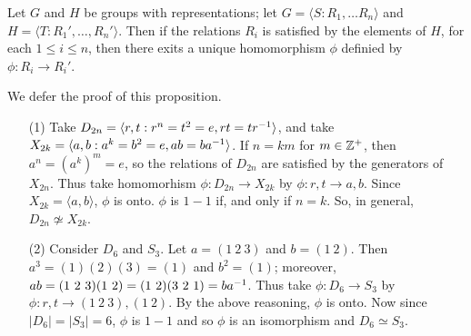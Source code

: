 \begin{proposition}\label{proposition_1.5.4}
  Let $G$ and  $H$ be groups with representations; let  $G=\langle S : R_1,
  \dots R_n \rangle$ and $H=\langle T : R_1', \dots, R_n'\rangle$. Then if the
  relations $R_i$ is satisfied by the elements of $H$, for each  $1 \leq i
  \leq n$, then there exits a unique homomorphism  $\phi$ definied by
  $\phi:R_i \rightarrow R_i'$.
\end{proposition}
\begin{remark}
  We defer the proof of this proposition.
\end{remark}

\begin{example}\label{example_1.14}
  \begin{enumerate}
    \item[(1)] Take $D_{2n}=\langle r,t : r^n=t^2=e, rt=tr^{-1} \rangle$, and
      take $X_{2k}=\langle a,b : a^k=b^2=e, ab=ba^{-1} \rangle$. If $n=km$ for  $m
      \in \mathbb{Z}^+$, then  $a^n=(a^k)^m=e$, so the relations of $D_{2n}$ are
      satisfied by the generators of $X_{2n}$. Thus take homomorhism
      $\phi:D_{2n} \rightarrow X_{2k}$ by $\phi:r,t \rightarrow a,b$.
      Since $X_{2k}=\langle a, b \rangle$, $\phi$ is onto.  $\phi$ is $1-1$
      if, and only if  $n=k$. So, in general, $D_{2n} \not\simeq X_{2k}$.

    \item[(2)] Consider $D_6$ and  $S_3$. Let $a=(1 \ 2 \ 3)$ and $b=(1 \
      2)$. Then $a^3=(1)(2)(3)=(1)$ and $b^2=(1)$; moreover, $ab=(1 \ 2 \
      3)(1 \ 2)=(1 \ 2)(3 \ 2 \ 1)=ba^{-1}$. Thus take $\phi:D_6
      \rightarrow S_3$ by $\phi:r,t \rightarrow (1 \ 2 \ 3), (1 \ 2)$. By
      the above reasoning,  $\phi$ is onto. Now since
      $|D_6|=|S_3|=6$, $\phi$ is  $1-1$ and so  $\phi$ is an
      isomorphism and  $D_6 \simeq S_3$.
  \end{enumerate}
\end{example}

